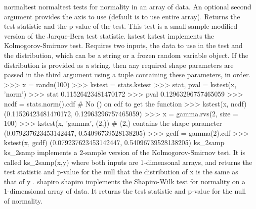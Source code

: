 normaltest
normaltest tests for normality in an array of data. An optional second argument provides the axis to use
(default is to use entire array). Returns the test statistic and the p-value of the test. This test is a small
sample modified version of the Jarque-Bera test statistic.
kstest
kstest implements the Kolmogorov-Smirnov test. Requires two inputs, the data to use in the test and the
distribution, which can be a string or a frozen random variable object. If the distribution is provided as
a string, then any required shape parameters are passed in the third argument using a tuple containing
these parameters, in order.
>>> x = randn(100)
>>> kstest = stats.kstest
>>> stat, pval = kstest(x, ’norm’)
>>> stat
0.11526423481470172
>>> pval
0.12963296757465059
>>> ncdf = stats.norm().cdf # No () on cdf to get the function
>>> kstest(x, ncdf)
(0.11526423481470172, 0.12963296757465059)
>>> x = gamma.rvs(2, size = 100)
>>> kstest(x, ’gamma’, (2,)) # (2,) contains the shape parameter
(0.079237623453142447, 0.54096739528138205)
>>> gcdf = gamma(2).cdf
>>> kstest(x, gcdf)
(0.079237623453142447, 0.54096739528138205)
ks_2samp
ks_2samp implements a 2-sample version of the Kolmogorov-Smirnov test. It is called ks_2samp(x,y)
where both inputs are 1-dimensonal arrays, and returns the test statistic and p-value for the null that
the distribution of x is the same as that of y .
shapiro
shapiro implements the Shapiro-Wilk test for normality on a 1-dimensional array of data. It returns the
test statistic and p-value for the null of normality.
